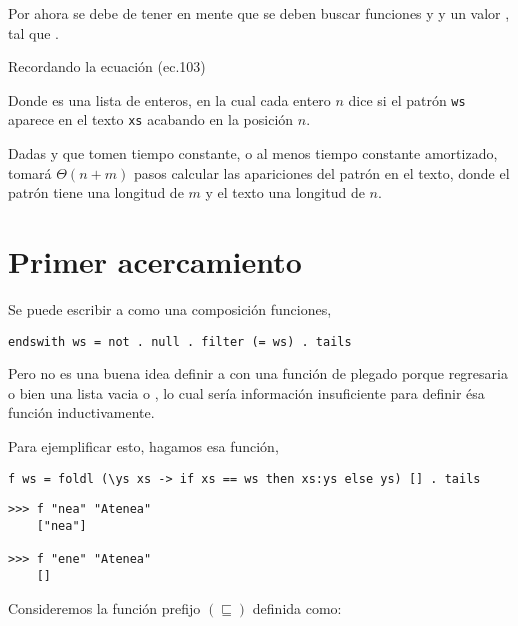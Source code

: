 Por ahora se debe de tener en mente que se deben buscar funciones  y  y un
valor , tal que .

Recordando la ecuación (ec.103) %

Donde  es una lista de enteros, en la cual cada entero $n$ dice si el patrón
\texttt{ws} aparece en el texto \texttt{xs} acabando en la posición $n$.

Dadas  y  que tomen tiempo constante, o al menos tiempo constante amortizado,
 tomará $\Theta(n + m)$ pasos calcular las apariciones del patrón en el texto, donde
el patrón tiene una longitud de $m$ y el texto una longitud de $n$.


\section{Primer acercamiento}

Se puede escribir a  como una composición funciones,
\begin{verbatim}
endswith ws = not . null . filter (= ws) . tails
\end{verbatim}

Pero no es una buena idea definir a  con una función de plegado
 porque regresaria o bien una lista vacia o \hsCode{[ws]}, lo cual sería información
insuficiente para definir ésa función inductivamente.

Para ejemplificar esto, hagamos esa función,
\begin{verbatim}
f ws = foldl (\ys xs -> if xs == ws then xs:ys else ys) [] . tails
\end{verbatim}

\begin{verbatim}
>>> f "nea" "Atenea"
    ["nea"]

>>> f "ene" "Atenea"
    []
\end{verbatim}

Consideremos la función prefijo $(\sqsubseteq)$ definida como:

\inputminted{haskell}{definiciones/prefix.hs}

